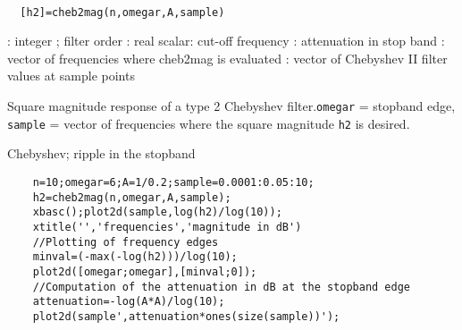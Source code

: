
\begin{mandesc}
   \\ %
\end{mandesc}
\begin{calling_sequence}
\begin{verbatim}
  [h2]=cheb2mag(n,omegar,A,sample)  
\end{verbatim}
\end{calling_sequence}
\begin{parameters}
  \begin{varlist}
    : integer ; filter order
    : real scalar: cut-off frequency
    : attenuation in stop band
    : vector of frequencies where cheb2mag is evaluated
    : vector of Chebyshev II filter values at sample points
  \end{varlist}
\end{parameters}
\begin{mandescription}
  Square magnitude response of a type 2 Chebyshev filter.\verb!omegar! = stopband edge, \verb!sample! = vector of 
  frequencies where the square magnitude \verb!h2! is desired.
\end{mandescription}
\begin{examples}
  Chebyshev; ripple in the stopband
  \begin{Verbatim}
    n=10;omegar=6;A=1/0.2;sample=0.0001:0.05:10;
    h2=cheb2mag(n,omegar,A,sample);
    xbasc();plot2d(sample,log(h2)/log(10));
    xtitle('','frequencies','magnitude in dB')
    //Plotting of frequency edges
    minval=(-max(-log(h2)))/log(10);
    plot2d([omegar;omegar],[minval;0]);
    //Computation of the attenuation in dB at the stopband edge
    attenuation=-log(A*A)/log(10);
    plot2d(sample',attenuation*ones(size(sample))');
  \end{Verbatim}
\end{examples}
\begin{manseealso}
\end{manseealso}
